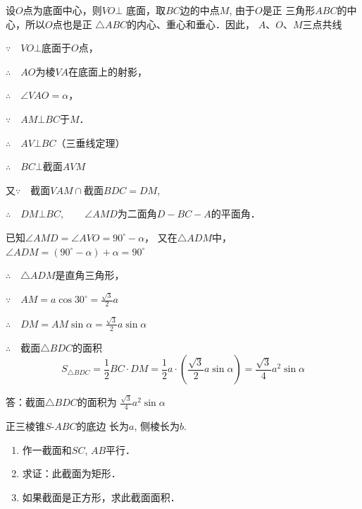 \begin{solution}
    设$O$点为底面中心，则$VO\bot$
底面，取$BC$边的中点$M$, 由于$O$是正
三角形$ABC$的中心，所以$O$点也是正
$\triangle ABC$的内心、重心和垂心．因此，
$A$、$O$、$M$三点共线

$\because\quad VO\bot$底面于$O$点，

$\therefore\quad AO$为棱$VA$在底面上的射影，

$\therefore\quad \angle VAO=\alpha$，

$\because\quad AM\bot BC$于$M$．

$\therefore\quad AV\bot BC$\qquad （三垂线定理）

$\therefore\quad BC\bot$截面$AVM$

又$\because\quad $截面$VAM\cap$截面$BDC=DM$, 

$\therefore\quad DM\bot BC,\qquad \angle AMD$为二面角$D-BC-A$的平面角．

已知$\angle AMD=\angle AVO=90^{\circ}-\alpha$，
又在$\triangle ADM$中，$\angle ADM=(90^{\circ}-\alpha)+\alpha=90^{\circ}$

$\therefore\quad \triangle ADM$是直角三角形，

$\because\quad AM=a\cos 30^{\circ}=\frac{\sqrt{3}}{2}a$

$\therefore\quad DM=AM\sin\alpha=\frac{\sqrt{3}}{2}a\sin\alpha$

$\therefore\quad $截面$\triangle BDC$的面积
\[S_{\triangle BDC}=\frac{1}{2}BC\cdot DM=\frac{1}{2}a\cdot \left(\frac{\sqrt{3}}{2}a\sin\alpha\right)=\frac{\sqrt{3}}{4}a^2\sin\alpha\]

答：截面$\triangle BDC$的面积为
$\frac{\sqrt{3}}{4}a^2\sin\alpha$
\end{solution}

\begin{example}
    正三棱锥$S$-$ABC$的底边
    长为$a$, 侧棱长为$b$. 
    
\begin{enumerate}
\item 作一截面和$SC$, $AB$平行．
    \item 求证：此截面为矩形．
    \item 如果截面是正方形，求此截面面积．
\end{enumerate}
\end{example}


\begin{figure}[htp]
    \centering
{}
    \caption{}
\end{figure}

